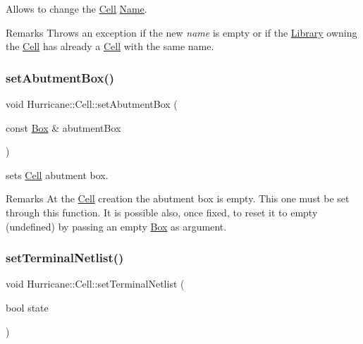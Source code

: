 Allows to change the \mbox{\hyperlink{classHurricane_1_1Cell}{Cell}} \mbox{\hyperlink{classHurricane_1_1Name}{Name}}.

\begin{DoxyRemark}{Remarks}
Throws an exception if the new {\itshape name} is empty or if the \mbox{\hyperlink{classHurricane_1_1Library}{Library}} owning the \mbox{\hyperlink{classHurricane_1_1Cell}{Cell}} has already a \mbox{\hyperlink{classHurricane_1_1Cell}{Cell}} with the same name. 
\end{DoxyRemark}
\mbox{\label{classHurricane_1_1Cell_ab1949e2b708f0bd2d215ab90cfe864e0}} 
\subsubsection{\texorpdfstring{set\+Abutment\+Box()}{setAbutmentBox()}}
{\footnotesize\ttfamily void Hurricane\+::\+Cell\+::set\+Abutment\+Box (\begin{DoxyParamCaption}\item[{const \mbox{\hyperlink{classHurricane_1_1Box}{Box}} \&}]{abutment\+Box }\end{DoxyParamCaption})}

sets \mbox{\hyperlink{classHurricane_1_1Cell}{Cell}} abutment box.

\begin{DoxyRemark}{Remarks}
At the \mbox{\hyperlink{classHurricane_1_1Cell}{Cell}} creation the abutment box is empty. This one must be set through this function. It is possible also, once fixed, to reset it to empty (undefined) by passing an empty \mbox{\hyperlink{classHurricane_1_1Box}{Box}} as argument. 
\end{DoxyRemark}
\mbox{\label{classHurricane_1_1Cell_a15958b25e911e8f5543557b6deea5618}} 
\subsubsection{\texorpdfstring{set\+Terminal\+Netlist()}{setTerminalNetlist()}}
{\footnotesize\ttfamily void Hurricane\+::\+Cell\+::set\+Terminal\+Netlist (\begin{DoxyParamCaption}\item[{bool}]{state }\end{DoxyParamCaption})\hspace{0.3cm}{\ttfamily [inline]}}

